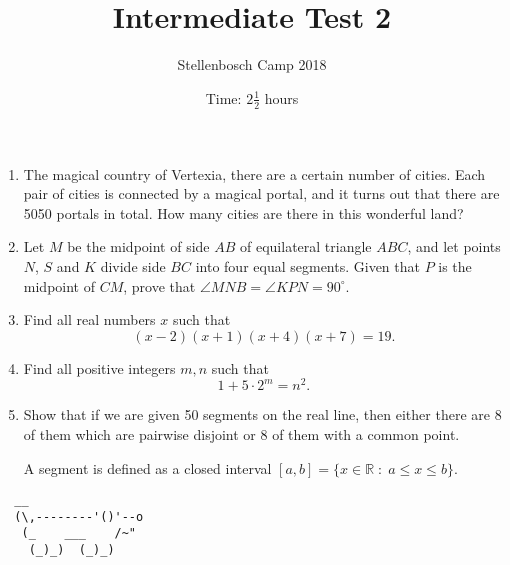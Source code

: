 \documentclass{article}
\title{Intermediate Test 2}
\author{Stellenbosch Camp 2018}
\date{Time: $2\frac{1}{2}$ hours}
\begin{document}
\maketitle

\begin{enumerate}[1.]

\item %
The magical country of Vertexia, there are a certain number of cities. Each pair of cities is connected by a magical portal, and it turns out that there are 5050 portals in total. How many cities are there in this wonderful land?

\vspace{12pt}
\item 
Let $M$ be the midpoint of side $AB$ of equilateral triangle $ABC$, and let points $N$, $S$ and $K$ divide side $BC$ into four equal segments. Given that $P$ is the midpoint of $CM$, prove that $\angle MNB = \angle KPN = 90^\circ$.

\vspace{12pt}
\item %
Find all real numbers $x$ such that \[ (x-2)(x+1)(x+4)(x+7) = 19. \]

\vspace{12pt}
\item %
Find all positive integers $m, n$ such that \[ 1 + 5 \cdot 2^m = n^2. \]

\vspace{12pt}
\item %
Show that if we are given 50 segments on the real line, then either there are 8 of them which are pairwise disjoint or 8 of them with a common point. 

A segment is defined as a closed interval $[a, b] = \{x \in \mathbb{R} \;:\; a \leq x \leq b \}$.

\end{enumerate}


\vspace{12pt}
\begin{center}
\begin{BVerbatim}
  __
  (\,--------'()'--o
   (_    ___    /~"
    (_)_)  (_)_)
\end{BVerbatim}
\end{center}
\end{document}
